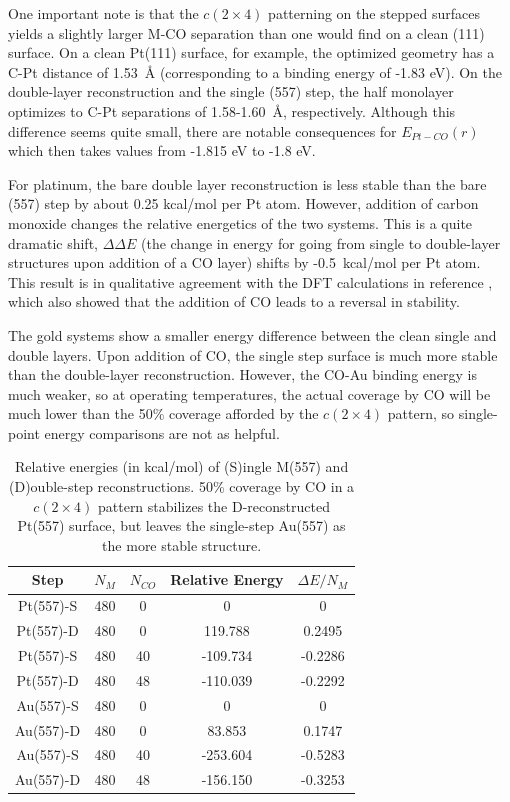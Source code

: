 \documentclass[journal = jpccck, manuscript = article]{achemso}
\begin{document}
One important note is that the $c (2 \times 4)$ patterning on the
stepped surfaces yields a slightly larger M-CO separation than one
would find on a clean (111) surface. On a clean Pt(111) surface, for
example, the optimized geometry has a C-Pt distance of 1.53~\AA
(corresponding to a binding energy of -1.83 eV).  On the double-layer
reconstruction and the single (557) step, the half monolayer optimizes
to C-Pt separations of 1.58-1.60~\AA, respectively.  Although this
difference seems quite small, there are notable consequences for
$E_{Pt-CO}(r)$ which then takes values from -1.815 eV to -1.8 eV.

For platinum, the bare double layer reconstruction is less stable than
the bare (557) step by about 0.25 kcal/mol per Pt atom. However,
addition of carbon monoxide changes the relative energetics of the two
systems. This is a quite dramatic shift, $\Delta\Delta E$ (the change
in energy for going from single to double-layer structures upon
addition of a CO layer) shifts by -0.5~kcal/mol per Pt atom. This
result is in qualitative agreement with the DFT calculations in
reference { \protect\cite{Tao:2010}}, which
also showed that the addition of CO leads to a reversal in stability.

The gold systems show a smaller energy difference between the clean
single and double layers. Upon addition of CO, the single step surface
is much more stable than the double-layer reconstruction.  However,
the CO-Au binding energy is much weaker, so at operating temperatures,
the actual coverage by CO will be much lower than the 50\% coverage
afforded by the $c (2 \times 4)$ pattern, so single-point energy
comparisons are not as helpful.

\begin{table}[H]
  \caption{Relative energies (in kcal/mol) of (S)ingle M(557) and
    (D)ouble-step reconstructions. 50\% coverage by CO in a  $c(2
    \times 4)$ pattern stabilizes the D-reconstructed Pt(557)
    surface, but leaves the single-step Au(557) as the more stable structure.} 
\centering
\begin{tabular}{| c | c | c | c | c |}
\hline
Step & $N_{M}$ & $N_{CO}$ & Relative Energy & $\Delta E / N_{M}$ \\
\hline
Pt(557)-S & 480 & 0  &  0 & 0 \\
Pt(557)-D & 480 & 0  &  119.788 & 0.2495 \\
Pt(557)-S & 480 & 40 &  -109.734 & -0.2286 \\
Pt(557)-D & 480 & 48 &  -110.039 & -0.2292 \\
\hline
\hline
Au(557)-S & 480 & 0  &  0 & 0  \\
Au(557)-D & 480 & 0  &  83.853 & 0.1747 \\
Au(557)-S & 480 & 40 &  -253.604 & -0.5283 \\
Au(557)-D & 480 & 48 &  -156.150 & -0.3253 \\
\hline
\end{tabular}
\label{tab:steps}
\end{table}
\end{document}
